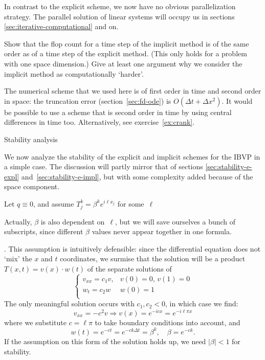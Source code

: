 In contrast to the explicit scheme, we now have no 
obvious parallelization strategy. The parallel solution of linear
systems will occupy us in sections \ref{sec:iterative-computational}
and on.

\begin{exercise}
  Show that the flop count for a time step of the implicit method is
  of the same order as of a time step of the explicit method. (This
  only holds for a problem with one space dimension.) Give at least
  one argument why we consider the implicit method as computationally
  `harder'.
\end{exercise}

The numerical scheme that we used here is of first order in time and
second order in space: the truncation error (section~\ref{sec:fd-ode})
is $O(\Delta t+\Delta x^2)$. It would be possible to use a scheme that
is second order in time by using central differences in time
too. Alternatively, see exercise~\ref{ex:crank}.

 {Stability analysis}

We now analyze the stability of the explicit and implicit
schemes for the \ac{IBVP} in a simple case.
The discussion will partly mirror that of
sections \ref{sec:stability-e-expl} and~\ref{sec:stability-e-impl},
but with some complexity added because of the space component.

Let $q\equiv0$, and assume
$T_j^k=\beta^ke^{i\ell x_j}$ for some~$\ell$
\begin{footnoteenv}
  {Actually,
  $\beta$ is also dependent on~$\ell$, but we will save ourselves a
  bunch of subscripts, since different $\beta$ values never appear
  together in one formula.}
\end{footnoteenv}
. This assumption is intuitively
defensible: since the differential equation does not `mix' the $x$ and
$t$ coordinates, we surmise that the solution will be a product
$T(x,t)=v(x)\cdot w(t)$ of the
separate solutions of
\begin{equation}
\begin{cases}
  v_{xx}=c_1 v,&v(0)=0,\,v(1)=0\\
  w_t=c_2 w & w(0)=1\\
\end{cases}
\end{equation}
The only meaningful solution occurs with $c_1,c_2<0$, in which case we
find:
\begin{equation}
  v_{xx}=-c^2v \Rightarrow v(x)=e^{-icx}=e^{-i\ell\pi x}
\end{equation}
where we substitute $c=\ell\pi$ to take boundary conditions into
account,
and 
\begin{equation}
  w(t) = e^{-ct} = e^{-ck\Delta t} = \beta^k,\quad \beta=e^{-ck}.
\end{equation}
If the assumption on this form of the solution holds up, we need
$|\beta|<1$ for stability.

